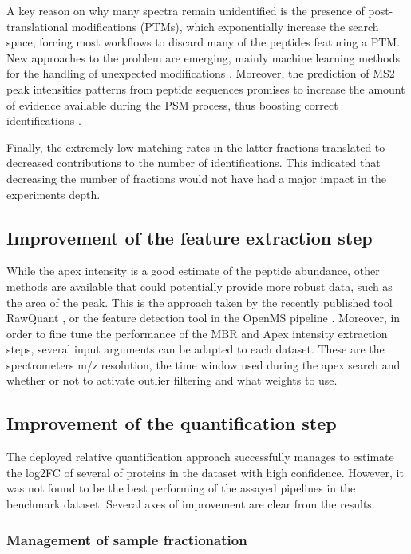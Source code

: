 A key reason on why many spectra remain unidentified is the presence of post-translational modifications (\ac{PTM}s), which exponentially increase the search space, forcing most workflows to discard many of the peptides featuring a PTM. New approaches to the problem are emerging, mainly machine learning methods for the handling of unexpected modifications \cite{Gabriels}. Moreover, the prediction of \ac{MS2} peak intensities patterns from peptide sequences promises to increase the amount of evidence available during the PSM process, thus boosting correct identifications \cite{Kirik2018} \cite{Degroeve2013}.

Finally, the extremely low matching rates in the latter fractions translated to decreased contributions to the number of identifications. This indicated that decreasing the number of fractions would not have had a major impact in the experiment\textquotesingle s depth.

\subsection{Improvement of the feature extraction step}

While the apex intensity is a good estimate of the peptide abundance, other methods are available that could potentially provide more robust data, such as the area of the peak. This is the approach taken by the recently published tool RawQuant \cite{Kovalchik2018}, or the feature detection tool in the OpenMS pipeline \cite{Sturm2008}. Moreover, in order to fine tune the performance of the \ac{MBR} and Apex intensity extraction steps, several input arguments can be adapted to each dataset. These are the spectrometer\textquotesingle s \ac{m/z} resolution, the time window used during the apex search and whether or not to activate outlier filtering and what weights to use.

\subsection{Improvement of the quantification step}

The deployed relative quantification approach successfully manages to estimate the \ac{log2FC} of several of proteins in the dataset with high confidence. However, it was not found to be the best performing of the assayed pipelines in the benchmark dataset. Several axes of improvement are clear from the results.

\subsubsection{Management of sample fractionation}


